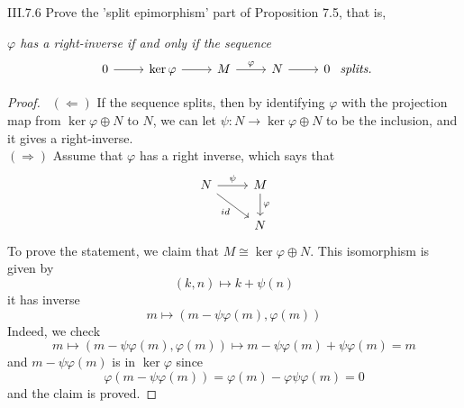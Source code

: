 \begin{problem}{III.7.6}
Prove the 'split epimorphism' part of Proposition 7.5, that is,

\textit{$\varphi$ has a right-inverse if and only if the sequence} 
\[
\begin{tikzcd}
0 \arrow[r] & \ker \varphi \arrow[r] & M \arrow[r, "\varphi"] & N \arrow[r] & 0
\end{tikzcd}	
\textit{ splits.}
\]
\end{problem}
\begin{proof} \
\noindent $(\Leftarrow)$ If the sequence splits, then by identifying $\varphi$ with the projection map from $\ker \varphi \oplus N$ to $N$, we can let $\psi : N \to \ker \varphi \oplus N $ to be the inclusion, and it gives a right-inverse. \\
$(\Rightarrow)$ Assume that $\varphi$ has a right inverse, which says that 
\[
\begin{tikzcd}
N \arrow[r, "\psi"] \arrow[rd, "id"'] & M \arrow[d, "\varphi"] \\
& N
\end{tikzcd}	
\]
To prove the statement, we claim that $M \cong \ker \varphi \oplus N$. This isomorphism is given by 
\[
(k,n) \mapsto k + \psi (n)
\]
it has inverse
\[
m \mapsto (m-\psi\varphi(m), \varphi(m))	
\]
Indeed, we check
\[
m \mapsto (m-\psi\varphi(m), \varphi(m)) \mapsto m-\psi\varphi(m) + \psi\varphi(m) = m
\]
and $m-\psi\varphi(m)$ is in $\ker \varphi$ since
\[
\varphi(m-\psi\varphi(m)) = \varphi(m) - \varphi\psi\varphi(m) = 0
\]
and the claim is proved.
\end{proof}

